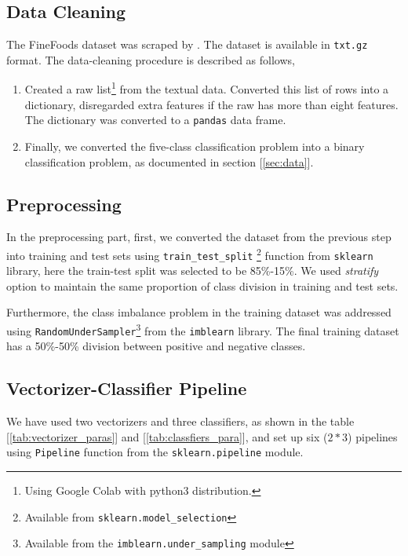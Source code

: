 \documentclass[11pt]{article}
\begin{document}
 \subsection{Data Cleaning}
The FineFoods dataset was scraped by \cite{finefoods}. The dataset is available in \texttt{txt.gz} format. The data-cleaning procedure is described as follows,
\begin{enumerate}
    \item Created a raw list\footnote{Using Google Colab with python3 distribution.} from the textual data. Converted this list of rows into a dictionary, disregarded extra features if the raw has more than eight features. The dictionary was converted to a \texttt{pandas} data frame.
    \item Finally, we converted the five-class classification problem into a binary classification problem, as documented in section [\ref{sec:data}].
\end{enumerate}
 \subsection{Preprocessing}
In the preprocessing part, first, we converted the dataset from the previous step into training and test sets using \texttt{train\_test\_split} \footnote{Available from \texttt{sklearn.model\_selection}} function from \texttt{sklearn} library, here the train-test split was selected to be 85\%-15\%. We used \textit{stratify} option to maintain the same proportion of class division in training and test sets.

Furthermore, the class imbalance problem in the training dataset was addressed using \texttt{RandomUnderSampler}\footnote{Available from the \texttt{imblearn.under\_sampling} module} from the \texttt{imblearn} library. The final training dataset has a 50\%-50\% division between positive and negative classes.

\subsection{Vectorizer-Classifier Pipeline}
We have used two vectorizers and three classifiers, as shown in the table [\ref{tab:vectorizer_paras}] and [\ref{tab:classfiers_para}], and set up six ($2 * 3$) pipelines using \texttt{Pipeline} function from the \texttt{sklearn.pipeline} module. 
\end{document}
